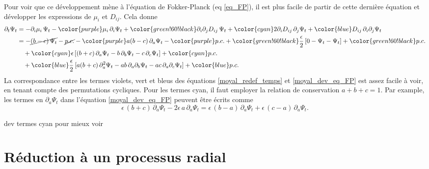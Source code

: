 \documentclass[openany,a4paper,12pt]{article}
\begin{document}
\par Pour voir que ce développement mène à l'équation de Fokker-Planck (eq \ref{eq_FP}), il est plus facile de partir de cette dernière équation et développer les expressions de $\mu_i$ et $D_{ij}$. Cela donne
%
\begin{equation}\label{moyal_dev_eq_FP}
\begin{split}
	\partial_t \Psi_t
	&= - \partial_i \mu_i \, \Psi_t
	- {\color{purple} \mu_i \, \partial_i \Psi_t }
	+ {\color{green!60!black} \partial_i\partial_j D_{ij} \, \Psi_t }
	+ {\color{cyan} 2 \partial_i D_{ij} \, \partial_j \Psi_t }
	+ {\color{blue} D_{ij} \,  \partial_i\partial_j \Psi_t } \\
	&= - \cancel{(b-c) \, \Psi_t} - \cancel{p.c.}
	- {\color{purple} a(b-c)\, \partial_a \Psi_t }
	- {\color{purple} p.c. }
	+ {\color{green!60!black} \frac \epsilon 2 \, [0-\Psi_t-\Psi_t] }
	+ {\color{green!60!black} p.c. } \\
	&\quad + {\color{cyan} \epsilon \, [ (b+c) \, \partial_a \Psi_t - b \, \partial_b \Psi_t - c \, \partial_c \Psi_t ] }
	+ {\color{cyan} p.c. } \\
	&\quad + {\color{blue} \frac \epsilon 2 \, [ a(b+c) \, \partial_a^2 \Psi_t - ab \, \partial_a\partial_b \Psi_t - ac \, \partial_a\partial_c \Psi_t ] }
	+ {\color{blue} p.c. }
\end{split} 
\end{equation}
%
La correspondance entre les termes violets, vert et bleus des équations \ref{moyal_redef_temps} et \ref{moyal_dev_eq_FP} est assez facile à voir, en tenant compte des permutations cycliques. Pour les termes cyan, il faut employer la relation de conservation $a+b+c=1$. Par example, les termes en $\partial_a\Psi_t$ dans l'équation \ref{moyal_dev_eq_FP} peuvent être écrits comme
%
\begin{equation}\label{moyal_terme_cyan_corresp}
	\epsilon\, (b+c)\, \partial_a\Psi_t -2\epsilon\, a\, \partial_a\Psi_t = \epsilon\, (b-a)\, \partial_a\Psi_t + \epsilon\, (c-a)\, \partial_a\Psi_t.
\end{equation}
%

{\color{red} dev termes cyan pour mieux voir}

\section{Réduction à un processus radial}
\end{document}

